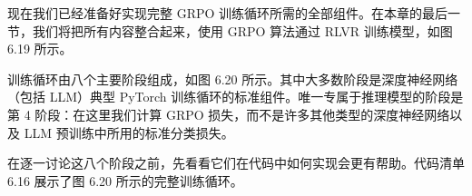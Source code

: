 现在我们已经准备好实现完整 GRPO 训练循环所需的全部组件。在本章的最后一节，我们将把所有内容整合起来，使用 GRPO 算法通过 RLVR 训练模型，如图 6.19 所示。


训练循环由八个主要阶段组成，如图 6.20 所示。其中大多数阶段是深度神经网络（包括 LLM）典型 PyTorch 训练循环的标准组件。唯一专属于推理模型的阶段是第 4 阶段：在这里我们计算 GRPO 损失，而不是许多其他类型的深度神经网络以及 LLM 预训练中所用的标准分类损失。


在逐一讨论这八个阶段之前，先看看它们在代码中如何实现会更有帮助。代码清单 6.16 展示了图 6.20 所示的完整训练循环。


